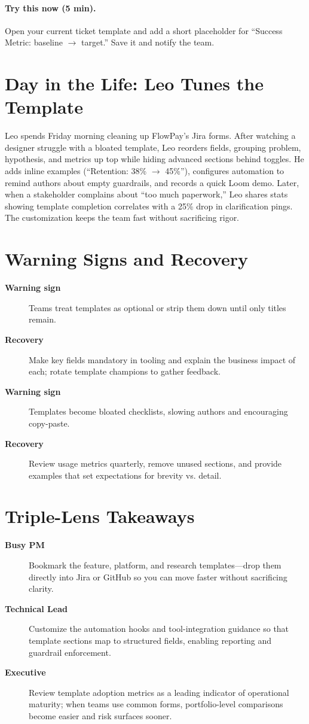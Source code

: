 \paragraph{Try this now (5 min).} Open your current ticket template and add a short placeholder for ``Success Metric: baseline $\rightarrow$ target.'' Save it and notify the team.

\section{Day in the Life: Leo Tunes the Template}
Leo spends Friday morning cleaning up FlowPay's Jira forms. After watching a designer struggle with a bloated template, Leo reorders fields, grouping problem, hypothesis, and metrics up top while hiding advanced sections behind toggles. He adds inline examples (``Retention: 38\% $\rightarrow$ 45\%''), configures automation to remind authors about empty guardrails, and records a quick Loom demo. Later, when a stakeholder complains about ``too much paperwork,'' Leo shares stats showing template completion correlates with a 25\% drop in clarification pings. The customization keeps the team fast without sacrificing rigor.
\section{Warning Signs and Recovery}
\label{sec:templates-warning}
\begin{description}
    \item[\textbf{Warning sign}] Teams treat templates as optional or strip them down until only titles remain.
    \item[\textbf{Recovery}] Make key fields mandatory in tooling and explain the business impact of each; rotate template champions to gather feedback.
    \item[\textbf{Warning sign}] Templates become bloated checklists, slowing authors and encouraging copy-paste.
    \item[\textbf{Recovery}] Review usage metrics quarterly, remove unused sections, and provide examples that set expectations for brevity vs. detail.
\end{description}

\section{Triple-Lens Takeaways}
\label{sec:templates-triple}

\begin{description}
    \item[\textbf{Busy PM}] Bookmark the feature, platform, and research templates—drop them directly into Jira or GitHub so you can move faster without sacrificing clarity.
    \item[\textbf{Technical Lead}] Customize the automation hooks and tool-integration guidance so that template sections map to structured fields, enabling reporting and guardrail enforcement.
    \item[\textbf{Executive}] Review template adoption metrics as a leading indicator of operational maturity; when teams use common forms, portfolio-level comparisons become easier and risk surfaces sooner.
\end{description}
